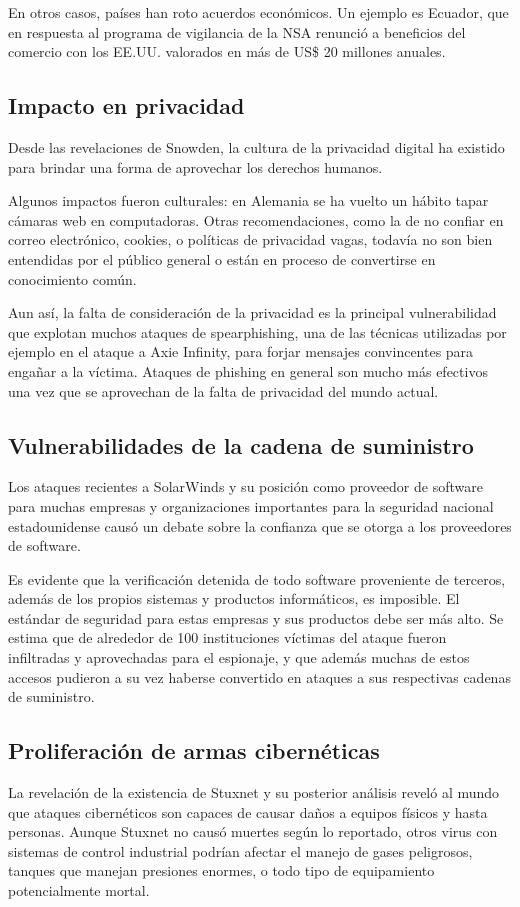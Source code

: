 \documentclass{article}
\begin{document}
En otros casos, países han roto acuerdos económicos. Un ejemplo es Ecuador, que en respuesta al programa de vigilancia de la NSA renunció a beneficios del comercio con los EE.UU. valorados en más de US\$ 20 millones anuales. \autocite{wiki-reaction-snowden}

\subsection{Impacto en privacidad}
Desde las revelaciones de Snowden, la cultura de la privacidad digital ha existido para brindar una forma de aprovechar los derechos humanos.

Algunos impactos fueron culturales: en Alemania se ha vuelto un hábito tapar cámaras web en computadoras. Otras recomendaciones, como la de no confiar en correo electrónico, cookies, o políticas de privacidad vagas, todavía no son bien entendidas por el público general o están en proceso de convertirse en conocimiento común.

Aun así, la falta de consideración de la privacidad es la principal vulnerabilidad que explotan muchos ataques de spearphishing, una de las técnicas utilizadas por ejemplo en el ataque a Axie Infinity, para forjar mensajes convincentes para engañar a la víctima. Ataques de phishing en general son mucho más efectivos una vez que se aprovechan de la falta de privacidad del mundo actual. \autocite{ronin-axie}

\subsection{Vulnerabilidades de la cadena de suministro}
Los ataques recientes a SolarWinds y su posición como proveedor de software para muchas empresas y organizaciones importantes para la seguridad nacional estadounidense causó un debate sobre la confianza que se otorga a los proveedores de software.

Es evidente que la verificación detenida de todo software proveniente de terceros, además de los propios sistemas y productos informáticos, es imposible. El estándar de seguridad para estas empresas y sus productos debe ser más alto. Se estima que de alrededor de 100 instituciones víctimas del ataque fueron infiltradas y aprovechadas para el espionaje, y que además muchas de estos accesos pudieron a su vez haberse convertido en ataques a sus respectivas cadenas de suministro. \autocite{wired-solarwinds} \autocite{npr-solarwinds}

\subsection{Proliferación de armas cibernéticas}
La revelación de la existencia de Stuxnet y su posterior análisis reveló al mundo que ataques cibernéticos son capaces de causar daños a equipos físicos y hasta personas. Aunque Stuxnet no causó muertes según lo reportado, otros virus con sistemas de control industrial podrían afectar el manejo de gases peligrosos, tanques que manejan presiones enormes, o todo tipo de equipamiento potencialmente mortal.
\end{document}
